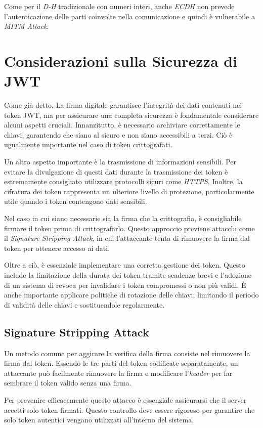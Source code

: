 Come per il \emph{D-H} tradizionale con numeri interi, anche \emph{ECDH} non prevede l'autenticazione delle parti coinvolte nella comunicazione e quindi è vulnerabile a \emph{MITM Attack}.


\section{Considerazioni sulla Sicurezza di JWT}
Come già detto, La firma digitale garantisce l'integrità dei dati contenuti nei token JWT, ma per assicurare una completa sicurezza è fondamentale considerare alcuni aspetti cruciali.
Innanzitutto, è necessario archiviare correttamente le chiavi, garantendo che siano al sicuro e non siano accessibili a terzi.
Ciò è ugualmente importante nel caso di token crittografati.

Un altro aspetto importante è la trasmissione di informazioni sensibili.
Per evitare la divulgazione di questi dati durante la trasmissione dei token è estremamente consigliato utilizzare protocolli sicuri come \emph{HTTPS}.
Inoltre, la cifratura dei token rappresenta un ulteriore livello di protezione, particolarmente utile quando i token contengono dati sensibili.

Nel caso in cui siano necessarie sia la firma che la crittografia, è consigliabile firmare il token prima di crittografarlo.
Questo approccio previene attacchi come il \emph{Signature Stripping Attack}, in cui l'attaccante tenta di rimuovere la firma dal token per ottenere accesso ai dati.

Oltre a ciò, è essenziale implementare una corretta gestione dei token. Questo include la limitazione della durata dei token tramite scadenze brevi e l'adozione di un sistema di revoca per invalidare i token compromessi o non più validi. È anche importante applicare politiche di rotazione delle chiavi, limitando il periodo di validità delle chiavi e sostituendole regolarmente.

\subsection{Signature Stripping Attack}
Un metodo comune per aggirare la verifica della firma consiste nel rimuovere la firma dal token.
Essendo le tre parti del token codificate separatamente, un attaccante può facilmente rimuovere la firma e modificare l'\emph{header} per far sembrare il token valido senza una firma.

Per prevenire efficacemente questo attacco è essenziale assicurarsi che il server accetti solo token firmati. Questo controllo deve essere rigoroso per garantire che solo token autentici vengano utilizzati all'interno del sistema.

